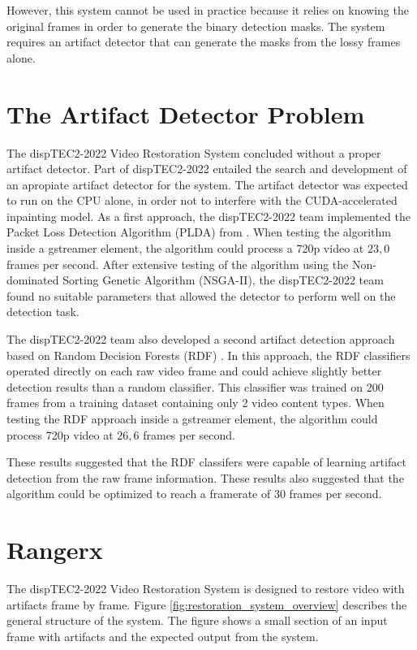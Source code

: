 However, this system cannot be used in practice because it relies on knowing the original frames in order to generate the binary detection masks. The system requires an artifact detector that can generate the masks from the lossy frames alone.

\section{The Artifact Detector Problem}
\label{sec:intro_problem}

The dispTEC2-2022 Video Restoration System concluded without a proper artifact detector. Part of dispTEC2-2022 entailed the search and development of an apropiate artifact detector for the system. The artifact detector was expected to run on the CPU alone, in order not to interfere with the CUDA-accelerated inpainting model. As a first approach, the dispTEC2-2022 team implemented the Packet Loss Detection Algorithm (PLDA) from \cite{Vranjes2018}. When testing the algorithm inside a gstreamer element, the algorithm could process a 720p video at $23,0$ frames per second.  After extensive testing of the algorithm using the Non-dominated Sorting Genetic Algorithm (NSGA-II), the dispTEC2-2022 team found no suitable parameters that allowed the detector to perform well on the detection task.

The dispTEC2-2022 team also developed a second artifact detection approach based on Random Decision Forests (RDF) \cite{Breiman2001}. In this approach, the RDF classifiers operated directly on each raw video frame and could achieve slightly better detection results than a random classifier. This classifier was trained on 200 frames from a training dataset containing only 2 video content types. When testing the RDF approach inside a gstreamer element, the algorithm could process 720p video at $26,6$ frames per second.

These results suggested that the RDF classifers were capable of learning artifact detection from the raw frame information. These results also suggested that the algorithm could be optimized to reach a framerate of $30$ frames per second.


\section{Rangerx}
\label{sec:intro_detector}

The dispTEC2-2022 Video Restoration System is designed to restore video with artifacts frame by frame. Figure \ref{fig:restoration_system_overview} describes the general structure of the system. The figure shows a small section of an input frame with artifacts and the expected output from the system.

